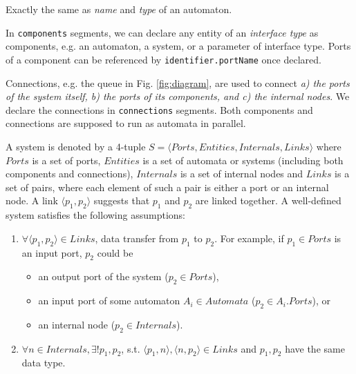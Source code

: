  Exactly the same as \emph{name} and \emph{type} of an automaton.

 In \texttt{components} segments, we can declare any entity of an \emph{interface type} as components, e.g. an automaton, a system, or a parameter of interface type. 
Ports of a component can be referenced by \texttt{identifier.portName} once declared.

 Connections, e.g. the queue in Fig. \ref{fig:diagram}, are used to connect \emph{a) the ports of the system itself, b) the ports of its components, and c) the internal nodes}. We declare the connections in \texttt{connections} segments.
Both components and connections are supposed to run as automata in parallel.

 



A system is denoted by a 4-tuple
$S=\langle Ports, Entities, Internals, Links\rangle$ where $Ports$ is a set of ports, $Entities$ is a set of automata or systems (including both components and connections), $Internals$ is a set of internal nodes and $Links$ is a set of pairs, where each element of such a pair is either a port or an internal node. A link $\langle p_1,p_2\rangle$ suggests that $p_1$ and $p_2$ are linked together. A well-defined system satisfies the following assumptions:

\begin{enumerate}
    \item $\forall \langle p_1,p_2\rangle \in Links$, data transfer from $p_1$ to $p_2$. For example, if $p_1\in Ports$ is an input port, $p_2$ could be
    \begin{itemize}
        \item an output port of the system ($p_2\in Ports$), 
        \item an input port of some automaton $A_i\in Automata$ ($p_2\in A_i.Ports$), or
        \item an internal node ($p_2\in Internals$).
    \end{itemize}
    \item $\forall n\in Internals,\exists!p_1,p_2$, s.t. $\langle p_1,n\rangle ,\langle n,p_2\rangle\in Links$ and $p_1,p_2$ have the same data type.
\end{enumerate}

